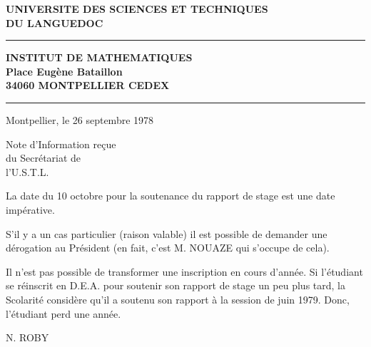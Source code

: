 
\begin{flushleft}
\textbf{UNIVERSITE DES SCIENCES ET TECHNIQUES}\\
\textbf{DU LANGUEDOC}

\rule{.6cm}{.3pt}

\textbf{INSTITUT DE MATHEMATIQUES}\\
\textbf{Place Eugène Bataillon}\\
\textbf{34060 MONTPELLIER CEDEX}

\rule{.8cm}{.3pt}
\end{flushleft}

\begin{flushright}
Montpellier, le 26 septembre 1978

Note d'Information reçue\\
du Secrétariat de\\
l'U.S.T.L.
\end{flushright}

La date du 10 octobre pour la soutenance du rapport de stage est une date impérative.

S'il y a un cas particulier (raison valable) il est possible de demander une dérogation au Président (en fait, c'est M. NOUAZE qui s'occupe de cela).

Il n'est pas possible de transformer une inscription en cours d'année. Si l'étudiant se réinscrit en D.E.A. pour soutenir son rapport de stage un peu plus tard, la Scolarité considère qu'il a soutenu son rapport à la session de juin 1979. Donc, l'étudiant perd une année.

\begin{flushright}
N. ROBY
\end{flushright}


